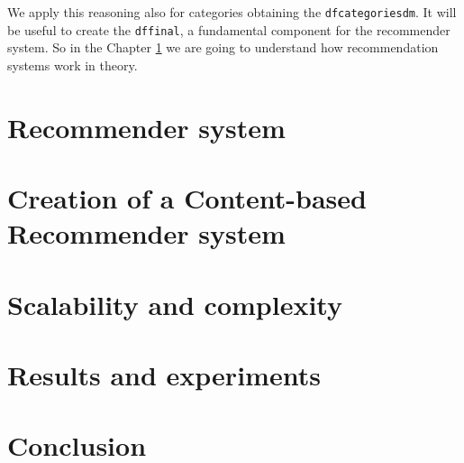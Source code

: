 \documentclass[12pt,english]{report}
\begin{document}
We apply this reasoning also for categories obtaining the \texttt{df\textunderscore categories\textunderscore dm}. It will be useful to create the \texttt{df\textunderscore final}, a fundamental component for the recommender system. So in the Chapter \ref{ch:recsys} we are going to understand how recommendation systems work in theory.
\chapter{Recommender system}\label{ch:recsys}
\chapter{Creation of a Content-based Recommender system}\label{ch:recsyscontbased}
\chapter{Scalability and complexity}\label{ch:scalability}
\chapter{Results and experiments}\label{ch:results}
\chapter{Conclusion}\label{ch:conclusion}


\lstlistoflistings


\end{document}
